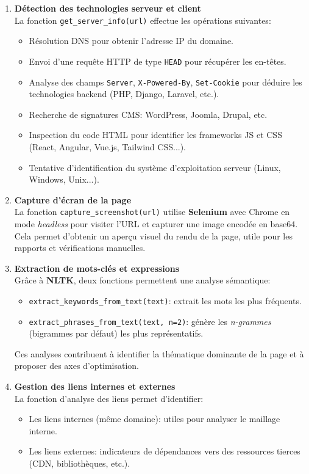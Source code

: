 \begin{justify}
\begin{enumerate}[label=\alph*)]
    \item \textbf{Détection des technologies serveur et client}\\
        La fonction \texttt{get\_server\_info(url)} effectue les opérations suivantes:
        \begin{itemize}[label=$\bullet$]
            \item Résolution DNS pour obtenir l’adresse IP du domaine.
            \item Envoi d’une requête HTTP de type \texttt{HEAD} pour récupérer les en-têtes.
            \item Analyse des champs \texttt{Server}, \texttt{X-Powered-By}, \texttt{Set-Cookie} pour déduire les technologies backend (PHP, Django, Laravel, etc.).
            \item Recherche de signatures CMS: WordPress, Joomla, Drupal, etc.
            \item Inspection du code HTML pour identifier les frameworks JS et CSS (React, Angular, Vue.js, Tailwind CSS...).
            \item Tentative d’identification du système d’exploitation serveur (Linux, Windows, Unix...).
        \end{itemize}
    \item \textbf{Capture d’écran de la page}\\
        La fonction \texttt{capture\_screenshot(url)} utilise \textbf{Selenium} avec Chrome en mode \textit{headless} pour visiter l’URL et capturer une image encodée en base64. Cela permet d’obtenir un aperçu visuel du rendu de la page, utile pour les rapports et vérifications manuelles.
    \item \textbf{Extraction de mots-clés et expressions}\\
        Grâce à \textbf{NLTK}, deux fonctions permettent une analyse sémantique:
        \begin{itemize}[label=$\bullet$]
            \item \texttt{extract\_keywords\_from\_text(text)}: extrait les mots les plus fréquents.
            \item \texttt{extract\_phrases\_from\_text(text, n=2)}: génère les \textit{n-grammes} (bigrammes par défaut) les plus représentatifs.
        \end{itemize}
        Ces analyses contribuent à identifier la thématique dominante de la page et à proposer des axes d’optimisation.
    \item \textbf{Gestion des liens internes et externes}\\
        La fonction d’analyse des liens permet d’identifier:
        \begin{itemize}[label=$\bullet$]
            \item Les liens internes (même domaine): utiles pour analyser le maillage interne.
            \item Les liens externes: indicateurs de dépendances vers des ressources tierces (CDN, bibliothèques, etc.).
        \end{itemize}
\end{enumerate}


\end{justify}
